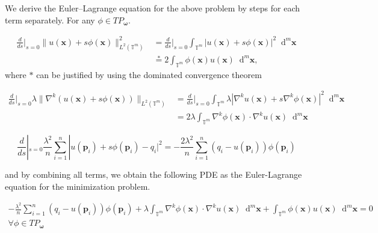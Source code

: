\documentclass[multixcb]{amstext-l}
\theoremstyle{plain}
\theoremstyle{definition}
\theoremstyle{definition}
\theoremstyle{remark}
\numberwithin{equation}{chapter}
\begin{document}
We derive the Euler--Lagrange equation for the above problem by steps for each term separately.
For any $\phi \in TP_{\boldsymbol{\omega}}$.

\begin{equation}\label{eq9b}
\begin{aligned}
\frac{d}{ds}|_{s=0} \|u(\boldsymbol{x})+s\phi(\boldsymbol{x})\|_{L^2(\mathbb{T}^m)}^2 &= \frac{d}{ds}|_{s=0} \int_{\mathbb{T}^m} \left|u(\boldsymbol{x})+s\phi(\boldsymbol{x})\right|^{2} \mathop{}\!\mathrm{d}^m\boldsymbol{x}\\
&\stackrel{*}{=} 2\int_{\mathbb{T}^m} \phi(\boldsymbol{x}) u(\boldsymbol{x})\mathop{}\!\mathrm{d}^m\boldsymbol{x}, 
\end{aligned}
\end{equation} where $*$ can be justified by using the dominated convergence theorem

\begin{equation}\label{eq10b}
\begin{aligned}
 \frac{d}{ds}|_{s=0} \lambda\| \nabla^k(u(\boldsymbol{x})+s\phi(\boldsymbol{x}))\|_{L^2(\mathbb{T}^m)} &= \frac{d}{ds}|_{s=0} \int_{\mathbb{T}^m} \lambda\left|\nabla^k u(\boldsymbol{x})+s \nabla^k \phi(\boldsymbol{x})\right|^2\mathop{}\!\mathrm{d}^m\boldsymbol{x}\\
&= 2\lambda\int_{\mathbb{T}^m} \nabla^k \phi(\boldsymbol{x}) \cdot \nabla^k u(\boldsymbol{x})\mathop{}\!\mathrm{d}^m\boldsymbol{x}
\end{aligned}
\end{equation}

\begin{equation}\label{eq11b}\frac{d}{ds}|_{s=0} \frac{\lambda^2}{n}\sum\limits_{i = 1}^n|u(\boldsymbol{p}_i)+s\phi(\boldsymbol{p}_i)-q_i|^2 =  -\frac{2\lambda^2}{n}\sum\limits_{i = 1}^n (q_i-u(\boldsymbol{p}_i))\phi(\boldsymbol{p}_i)
\end{equation}

and by combining all terms, we obtain the following PDE as the Euler-Lagrange equation for the minimization problem.

\begin{equation}\label{eq12b}
\begin{aligned}
-\frac{\lambda^2}{n}\sum\limits_{i = 1}^{n}(q_i-u(\boldsymbol{p}_i))\phi(\boldsymbol{p}_i) + \lambda\int_{\mathbb{T}^m}\nabla^k\phi(\boldsymbol{x})\cdot \nabla^k u(\boldsymbol{x}) \mathop{}\!\mathrm{d}^m\boldsymbol{x}+  \int_{\mathbb{T}^m} \phi(\boldsymbol{x}) u(\boldsymbol{x})\mathop{}\!\mathrm{d}^m\boldsymbol{x}  = 0 \\
\forall \phi \in  TP_{\boldsymbol{\omega}}
\end{aligned}
\end{equation}
\end{document}
